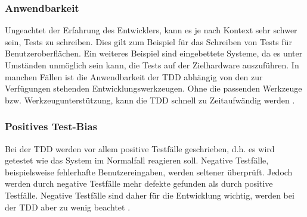 

\subsubsection{Anwendbarkeit} Ungeachtet der Erfahrung des Entwicklers, kann es je nach Kontext sehr schwer sein, Tests zu schreiben. Dies gilt zum Beispiel für das Schreiben von Tests für Benutzeroberflächen. Ein weiteres Beispiel sind eingebettete Systeme, da es unter Umständen unmöglich sein kann, die Tests auf der Zielhardware auszuführen. In manchen Fällen ist die Anwendbarkeit der TDD abhängig von den zur Verfügungen stehenden Entwicklungswerkzeugen. Ohne die passenden Werkzeuge bzw. Werkzeugunterstützung, kann die TDD schnell zu Zeitaufwändig werden \cite{Kollanus2011CriticalDevelopment}.

\subsubsection{Positives Test-Bias} Bei der TDD werden vor allem positive Testfälle geschrieben, d.h. es wird getestet wie das System im Normalfall reagieren soll. Negative Testfälle, beispielsweise fehlerhafte Benutzereingaben, werden seltener überprüft. Jedoch werden durch negative Testfälle mehr defekte gefunden als durch positive Testfälle. Negative Testfälle sind daher für die Entwicklung wichtig, werden bei der TDD aber zu wenig beachtet \cite{Causevic2013EffectsExperiment}.


